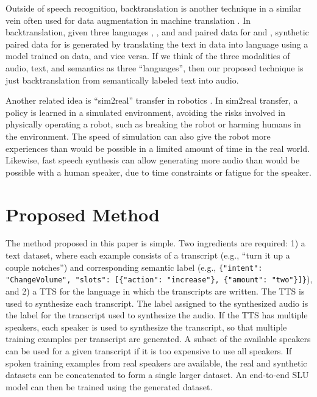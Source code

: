 \documentclass{article}
\begin{document}
Outside of speech recognition, backtranslation is another technique in a similar vein often used for data augmentation in machine translation \cite{poncelas2018investigating}. In backtranslation, given three languages , , and  and paired data for  and , synthetic paired data for  is generated by translating the  text in  data into language  using a model trained on  data, and vice versa. If we think of the three modalities of audio, text, and semantics as three ``languages'', then our proposed technique is just backtranslation from semantically labeled text into audio.

Another related idea is ``sim2real'' transfer in robotics \cite{jakobi1995noise}. In sim2real transfer, a policy is learned in a simulated environment, avoiding the risks involved in physically operating a robot, such as breaking the robot or harming humans in the environment. The speed of simulation can also give the robot more experiences than would be possible in a limited amount of time in the real world. Likewise, fast speech synthesis can allow generating more audio than would be possible with a human speaker, due to time constraints or fatigue for the speaker.


\section{Proposed Method}
\label{sec:proposed_method}
The method proposed in this paper is simple. Two ingredients are required: 1) a text dataset, where each example consists of a transcript (e.g., ``turn it up a couple notches'') and corresponding semantic label (e.g., \texttt{\{"intent": "ChangeVolume", "slots": [\{"action": "increase"\}, \{"amount": "two"\}]\}}), and 2) a TTS for the language in which the transcripts are written. The TTS is used to synthesize each transcript. The label assigned to the synthesized audio is the label for the transcript used to synthesize the audio. If the TTS has multiple speakers, each speaker is used to synthesize the transcript, so that multiple training examples per transcript are generated. A subset of the available speakers can be used for a given transcript if it is too expensive to use all speakers. If spoken training examples from real speakers are available, the real and synthetic datasets can be concatenated to form a single larger dataset. An end-to-end SLU model can then be trained using the generated dataset.
\end{document}
